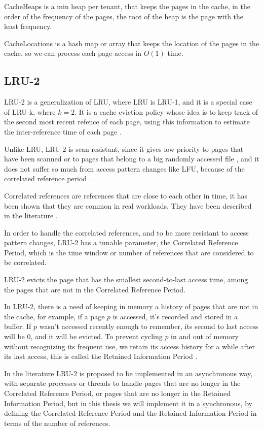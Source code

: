 CacheHeaps is a min heap per tenant, that keeps the pages in the cache, in the order of the
frequency of the pages, the root of the heap is the page with the least frequency.

CacheLocations is a hash map or array that keeps the location of the pages in the cache,
so we can process each page access in $O(1)$ time.

\subsection{LRU-2}

LRU-2 is a generalization of LRU, where LRU is LRU-1, and it is a special case of LRU-k, 
where $k = 2$. It is a cache eviction policy whose idea is to keep track of 
the second most recent refence of each page, using this information to estimate the 
inter-reference time of each page \cite{lru-k}.

Unlike LRU, LRU-2 is scan resistant, since it gives low priority to pages that have been 
scanned or to pages that belong to a big randomly accessed file \cite{2q-article}, and it 
does not suffer so much from access pattern changes like LFU, because of the correlated 
reference period \cite{lru-k}.

Correlated references are references that are close to each other in time, it has been 
shown that they are common in real workloads. They have been described in the literature 
\cite{lru-k} \cite{2q-article} \cite{lrfu-article}.

In order to handle the correlated references, and to be more resistant to access pattern 
changes, LRU-2 has a tunable parameter, the Correlated Reference Period, which is the
time window or number of references that are considered to be correlated.

LRU-2 evicts the page that has the smallest second-to-last access time, among the pages
that are not in the Correlated Reference Period.

In LRU-2, there is a need of keeping in memory a history of pages that are not in the 
cache, for example, if a page $p$ is accessed, it's recorded and stored in a buffer. If 
$p$ wasn't accessed recently enough to remember, its second to last access will be 0, 
and it will be evicted. To prevent cycling $p$ in and out of memory without recognizing 
its frequent use, we retain its access history for a while after its last access, this is 
called the Retained Information Period \cite{lru-k} \cite{2q-article}.

In the literature \cite{lru-k} LRU-2 is proposed to be implemented in an asynchronous way,
with separate processes or threads to handle pages that are no longer in the Correlated 
Reference Period, or pages that are no longer in the Retained Information Period, but in 
this thesis we will implement it in a synchronous, by defining the Correlated Reference
Period and the Retained Information Period in terms of the number of references.

